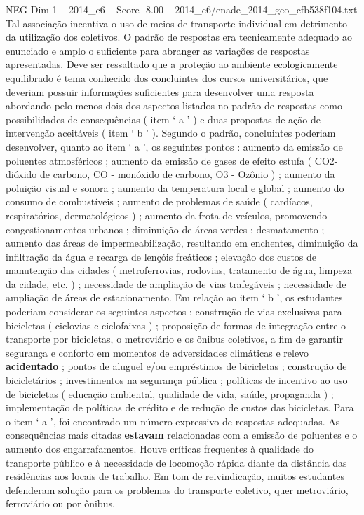 \begin{textsample}{NEG Dim 1 – 2014\_c6 – Score -8.00 – 2014\_c6/enade\_2014\_geo\_cfb538f104.txt}
Tal associação incentiva o uso de meios de transporte individual em detrimento da utilização dos coletivos.
O padrão de respostas era tecnicamente adequado ao enunciado e amplo o suficiente para abranger as variações de respostas apresentadas.
Deve ser ressaltado que a proteção ao ambiente ecologicamente equilibrado é tema conhecido dos concluintes dos cursos universitários, que deveriam possuir informações suficientes para desenvolver uma resposta abordando pelo menos dois dos aspectos listados no padrão de respostas como possibilidades de consequências ( item ‘ a ’ ) e duas propostas de ação de intervenção aceitáveis ( item ‘ b ’ ).
Segundo o padrão, concluintes poderiam desenvolver, quanto ao item ‘ a ’, os seguintes pontos : aumento da emissão de poluentes atmosféricos ; aumento da emissão de gases de efeito estufa ( CO2- dióxido de carbono, CO - monóxido de carbono, O3 - Ozônio ) ; aumento da poluição visual e sonora ; aumento da temperatura local e global ; aumento do consumo de combustíveis ; aumento de problemas de saúde ( cardíacos, respiratórios, dermatológicos ) ; aumento da frota de veículos, promovendo congestionamentos urbanos ; diminuição de áreas verdes ; desmatamento ; aumento das áreas de impermeabilização, resultando em enchentes, diminuição da infiltração da água e recarga de lençóis freáticos ; elevação dos custos de manutenção das cidades ( metroferrovias, rodovias, tratamento de água, limpeza da cidade, etc. ) ; necessidade de ampliação de vias trafegáveis ; necessidade de ampliação de áreas de estacionamento.
Em relação ao item ‘ b ’, os estudantes poderiam considerar os seguintes aspectos : construção de vias exclusivas para bicicletas ( ciclovias e ciclofaixas ) ; proposição de formas de integração entre o transporte por bicicletas, o metroviário e os ônibus coletivos, a fim de garantir segurança e conforto em momentos de adversidades climáticas e relevo \textbf{acidentado} ; pontos de aluguel e/ou empréstimos de bicicletas ; construção de bicicletários ; investimentos na segurança pública ; políticas de incentivo ao uso de bicicletas ( educação ambiental, qualidade de vida, saúde, propaganda ) ; implementação de políticas de crédito e de redução de custos das bicicletas.
Para o item ‘ a ’, foi encontrado um número expressivo de respostas adequadas.
As consequências mais citadas \textbf{estavam} relacionadas com a emissão de poluentes e o aumento dos engarrafamentos.
Houve críticas frequentes à qualidade do transporte público e à necessidade de locomoção rápida diante da distância das residências aos locais de trabalho.
Em tom de reivindicação, muitos estudantes defenderam solução para os problemas do transporte coletivo, quer metroviário, ferroviário ou por ônibus.

\end{textsample}
